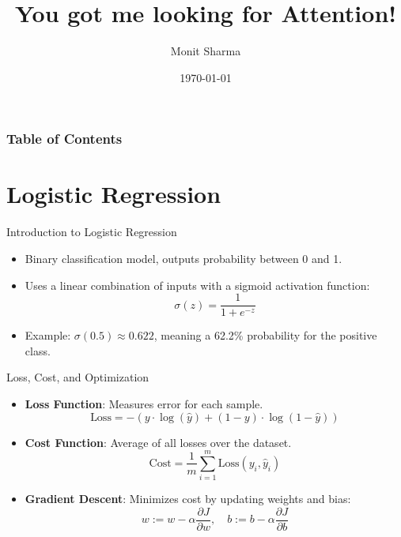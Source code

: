 \documentclass{beamer}
\title{You got me looking for Attention!}
\author{Monit Sharma}
\date{\today}
\begin{document}
\frame{\titlepage}

\begin{frame}
    \frametitle{Table of Contents}
    \tableofcontents
\end{frame}

\section{Logistic Regression}
\begin{frame}{Introduction to Logistic Regression}
    \begin{itemize}
        \item Binary classification model, outputs probability between 0 and 1.
        \item Uses a linear combination of inputs with a sigmoid activation function:
        $$
        \sigma(z) = \frac{1}{1 + e^{-z}}
        $$
        \item Example: $\sigma(0.5) \approx 0.622$, meaning a 62.2\% probability for the positive class.
    \end{itemize}
\end{frame}

\begin{frame}{Loss, Cost, and Optimization}
    \begin{itemize}
        \item \textbf{Loss Function}: Measures error for each sample.
        $$
        \text{Loss} = - \left( y \cdot \log(\hat{y}) + (1 - y) \cdot \log(1 - \hat{y}) \right)
        $$
        \item \textbf{Cost Function}: Average of all losses over the dataset.
        $$
        \text{Cost} = \frac{1}{m} \sum_{i=1}^{m} \text{Loss}(y_i, \hat{y}_i)
        $$
        \item \textbf{Gradient Descent}: Minimizes cost by updating weights and bias:
        $$
        w := w - \alpha \frac{\partial J}{\partial w}, \quad b := b - \alpha \frac{\partial J}{\partial b}
        $$
    \end{itemize}
\end{frame}

\end{document}
